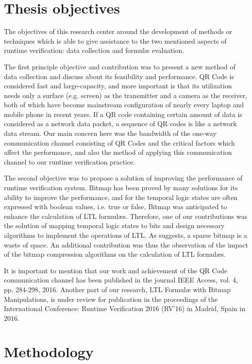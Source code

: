 \section{Thesis objectives}

The objectives of this research center around the development of methods or techniques which is able to give assistance to the two mentioned aspects of runtime verification: data collection and formul\ae{} evaluation.

The first principle objective and contribution was to present a new method of data collection and discuss about its feasibility and performance. QR Code is considered fast and large-capacity, and more important is that its utilization needs only a surface (e.g. screen) as the transmitter and a camera as the receiver, both of which have become mainstream configuration of nearly every laptop and mobile phone in recent years. If a QR code containing certain amount of data is considered as a network data packet, a sequence of QR codes is like a network data stream. Our main concern here was the bandwidth of the one-way communication channel consisting of QR Codes and the critical factors which affect the performance, and also the method of applying this communication channel to our runtime verification practice.

The second objective was to propose a solution of improving the performance of runtime verification system. Bitmap has been proved by many solutions for its ability to improve the performance, and for the temporal logic states are often expressed with boolean values, i.e. true or false, Bitmap was anticipated to enhance the calculation of LTL formul\ae{}s. Therefore, one of our contributions was the solution of mapping temporal logic states to bits and design necessary algorithms to implement the operations of LTL. As \cite{lemire2014} suggests, a sparse bitmap is a waste of space. An additional contribution was thus the observation of the impact of the bitmap compression algorithms on the calculation of LTL formul\ae{}s.

It is important to mention that our work and achievement of the QR Code communication channel has been published in the journal IEEE Access, vol. 4, pp. 284-298, 2016. Another part of our research, LTL Formul\ae{} with Bitmap Manipulations, is under review for publication in the proceedings of the International Conference: Runtime Verification 2016 (RV'16) in Madrid, Spain in 2016.

\section{Methodology}


